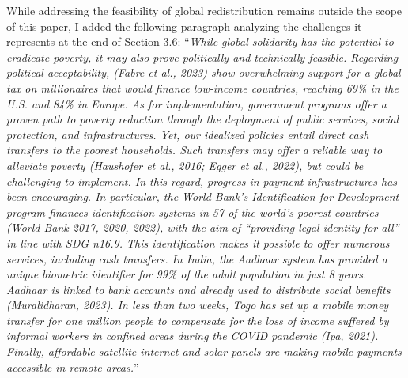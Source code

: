 \documentclass[12pt,english]{article}
\begin{document}
While addressing the feasibility of global redistribution remains outside the scope of this paper, I added the following paragraph analyzing the challenges it represents at the end of Section 3.6: 
``\textit{While global solidarity has the potential to eradicate poverty, it may also prove politically and technically feasible. 
Regarding political acceptability, (Fabre et al., 2023) show overwhelming support for a global tax on millionaires that would finance low-income countries, reaching 69\% in the U.S. and 84\% in Europe. %
As for implementation, government programs offer a proven path to poverty reduction through the deployment of public services, social protection, and infrastructures. 
Yet, our idealized policies entail direct cash transfers to the poorest households. Such transfers may offer a reliable way to alleviate poverty (Haushofer et al., 2016; Egger et al., 2022), but could be challenging to implement. In this regard, progress in payment infrastructures has been encouraging. In particular, the World Bank's \textit{Identification for Development} program finances identification systems in 57 of the world's poorest countries (World Bank 2017, 2020, 2022), with the aim of ``providing legal identity for all'' in line with SDG n\textdegree{}16.9. This identification makes it possible to offer numerous services, including cash transfers. In India, the Aadhaar system has provided a unique biometric identifier for 99\% of the adult population in just 8 years. Aadhaar is linked to bank accounts and already used to distribute social benefits (Muralidharan, 2023). In less than two weeks, Togo has set up a mobile money transfer for one million people to compensate for the loss of income suffered by informal workers in confined areas during the COVID pandemic (Ipa, 2021). Finally, affordable satellite internet and solar panels are making mobile payments accessible in remote areas.}''
~\\ ~\\

\clearpage 
\renewcommand{\url}[1]{\href{#1}{Link}} 
%  
% 
\end{document}
